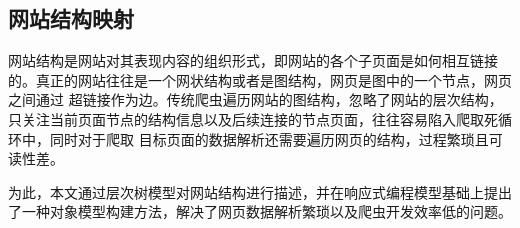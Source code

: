 \documentclass[master]{njuthesis}
\begin{document}





\subsection{网站结构映射}
网站结构是网站对其表现内容的组织形式，即网站的各个子页面是如何相互链接的。真正的网站往往是一个网状结构或者是图结构，网页是图中的一个节点，网页之间通过
超链接作为边。传统爬虫遍历网站的图结构，忽略了网站的层次结构，只关注当前页面节点的结构信息以及后续连接的节点页面，往往容易陷入爬取死循环中，同时对于爬取
目标页面的数据解析还需要遍历网页的结构，过程繁琐且可读性差。

为此，本文通过层次树模型对网站结构进行描述，并在响应式编程模型基础上提出了一种对象模型构建方法，解决了网页数据解析繁琐以及爬虫开发效率低的问题。
\end{document}
